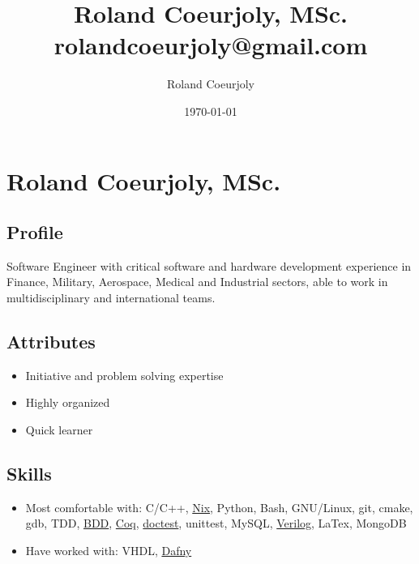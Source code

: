 \documentclass[11pt]{article}
\author{Roland Coeurjoly}
\date{\today}
\title{Roland Coeurjoly, MSc.\\\medskip
\large rolandcoeurjoly@gmail.com}
\begin{document}
\maketitle
\section*{Roland Coeurjoly, MSc.}
\label{sec:org615561c}
\subsection*{Profile}
\label{sec:org5802577}
Software Engineer with critical software and hardware development experience in Finance, Military, Aerospace, Medical and Industrial sectors, able to work in multidisciplinary and international teams.\\
\subsection*{Attributes}
\label{sec:org040112c}
\begin{itemize}
\item Initiative and problem solving expertise\\
\item Highly organized\\
\item Quick learner\\
\end{itemize}
\subsection*{Skills}
\label{sec:orgca8a7c4}
\begin{itemize}
\item Most comfortable with: C/C++, \href{https://nixos.org/}{Nix}, Python, Bash, GNU/Linux, git, cmake, gdb, TDD, \href{https://www.agilealliance.org/glossary/bdd/}{BDD}, \href{https://coq.inria.fr/}{Coq}, \href{https://github.com/onqtam/doctest}{doctest}, unittest, MySQL, \href{https://github.com/RCoeurjoly/Space-Invaders}{Verilog}, LaTex, MongoDB\\
\item Have worked with: VHDL, \href{https://dafny.org/}{Dafny}\\
\end{itemize}
\end{document}
